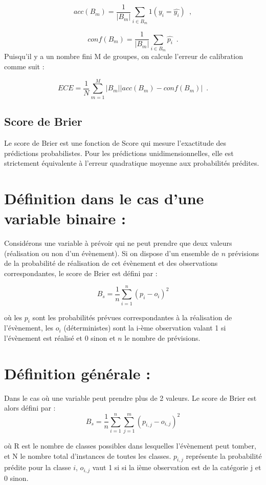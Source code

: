 \documentclass[
  letterpaper,
  DIV=11,
  numbers=noendperiod]{scrartcl}
\begin{document}
\[
acc(B_m)=\frac{1}{|B_m|}\sum_{i\in B_m}{1}(y_i=\hat{y_i}) \enspace ,
\]

\[
conf(B_m)=\frac{1}{|B_m|}\sum_{i\in B_m}\hat{p_i} \enspace .
\] Puisqu'il y a un nombre fini M de groupes, on calcule l'erreur de
calibration comme suit :

\[
ECE=\frac{1}{N}\sum_{m=1}^{M}|B_m||acc(B_m)-conf(B_m)|\enspace .
\]

\hypertarget{score-de-brier}{%
\subsection{Score de Brier}\label{score-de-brier}}

Le score de Brier est une fonction de Score qui mesure l'exactitude des
prédictions probabilistes. Pour les prédictions unidimensionnelles, elle
est strictement équivalente à l'erreur quadratique moyenne aux
probabilités prédites.

\hypertarget{duxe9finition-dans-le-cas-dune-variable-binaire}{%
\section{Définition dans le cas d'une variable binaire
:}\label{duxe9finition-dans-le-cas-dune-variable-binaire}}

Considérons une variable à prévoir qui ne peut prendre que deux valeurs
(réalisation ou non d'un évènement). Si on dispose d'un ensemble de
\(n\) prévisions de la probabilité de réalisation de cet évènement et
des observations correspondantes, le score de Brier est défini par :

\[
B_s = \frac{1}{n}\sum_{i=1}^{n}(p_i - o_i)^2
\]

où les \(p_i\) sont les probabilités prévues correspondantes à la
réalisation de l'évènement, les \(o_{i}\) (déterministes) sont la i-ème
observation valant 1 si l'évènement est réalisé et 0 sinon et \(n\) le
nombre de prévisions.

\hypertarget{duxe9finition-guxe9nuxe9rale}{%
\section{Définition générale :}\label{duxe9finition-guxe9nuxe9rale}}

Dans le cas où une variable peut prendre plus de 2 valeurs. Le score de
Brier est alors défini par : \[
B_s = \frac{1}{n}\sum_{i=1}^{n}\sum_{j=1}^{m}(p_{i,j} - o_{i,j})^2
\]

où R est le nombre de classes possibles dans lesquelles l'évènement peut
tomber, et N le nombre total d'instances de toutes les classes.
\(p_{i,j}\) représente la probabilité prédite pour la classe \(i\),
\(o_{i,j}\) vaut 1 si si la ième observation est de la catégorie j et 0
sinon.
\end{document}
